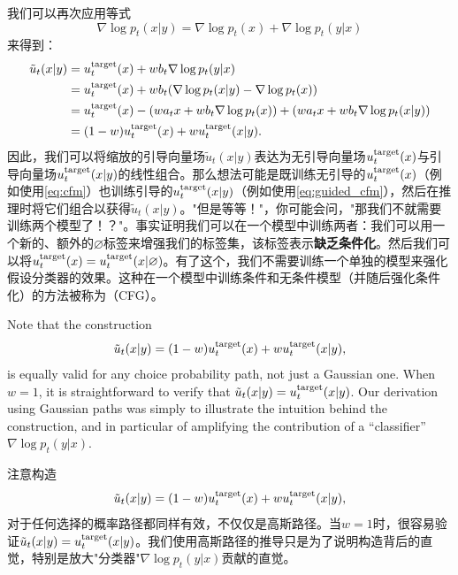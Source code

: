 我们可以再次应用等式$$\nabla \log p_t(x|y) = \nabla \log p_t(x) + \nabla \log p_t(y|x)$$来得到：
\begin{align*}\tilde{u}_t(x|y) &= u^{\text{target}}_t(x) + w b_t \nabla \log p_t(y|x)\\
&= u^{\text{target}}_t(x) + w b_t (\nabla \log p_t(x|y) - \nabla \log p_t(x))\\
&= u^{\text{target}}_t(x) - (w a_tx + w b_t \nabla \log p_t(x)) + (w a_t x + w b_t \nabla \log p_t(x|y))\\
&= (1-w) u^{\text{target}}_t(x) + w u^{\text{target}}_t(x|y).\end{align*}
因此，我们可以将缩放的引导向量场$\tilde{u}_t(x|y)$表达为无引导向量场$u^{\text{target}}_t(x)$与引导向量场$u^{\text{target}}_t(x|y)$的线性组合。那么想法可能是既训练无引导的$u^{\text{target}}_t(x)$（例如使用\cref{eq:cfm}）也训练引导的$u^{\text{target}}_t(x|y)$（例如使用\cref{eq:guided_cfm}），然后在推理时将它们组合以获得$\tilde{u}_t(x|y)$。"但是等等！"，你可能会问，"那我们不就需要训练两个模型了！？"。事实证明我们可以在一个模型中训练两者：我们可以用一个新的、额外的$\varnothing$标签来增强我们的标签集，该标签表示\textbf{缺乏条件化}。然后我们可以将$u^{\text{target}}_t(x)=u^{\text{target}}_t(x|\varnothing)$。有了这个，我们不需要训练一个单独的模型来强化假设分类器的效果。这种在一个模型中训练条件和无条件模型（并随后强化条件化）的方法被称为（CFG）\cite{cfg}。 

\begin{remarkbox}
Note that the construction
\begin{equation*}
    \tilde{u}_t(x|y) = (1-w) u^{\text{target}}_t(x) + w u^{\text{target}}_t(x|y),
\end{equation*}
is equally valid for any choice probability path, not just a Gaussian one. When $w=1$, it is straightforward to verify that $\tilde{u}_t(x|y)=u^{\text{target}}_t(x|y)$. Our derivation using Gaussian paths was simply to illustrate the intuition behind the construction, and in particular of amplifying the contribution of a ``classifier'' $\nabla \log p_t(y|x)$.

注意构造
\begin{equation*}
    \tilde{u}_t(x|y) = (1-w) u^{\text{target}}_t(x) + w u^{\text{target}}_t(x|y),
\end{equation*}
对于任何选择的概率路径都同样有效，不仅仅是高斯路径。当$w=1$时，很容易验证$\tilde{u}_t(x|y)=u^{\text{target}}_t(x|y)$。我们使用高斯路径的推导只是为了说明构造背后的直觉，特别是放大"分类器"$\nabla \log p_t(y|x)$贡献的直觉。
\end{remarkbox}

